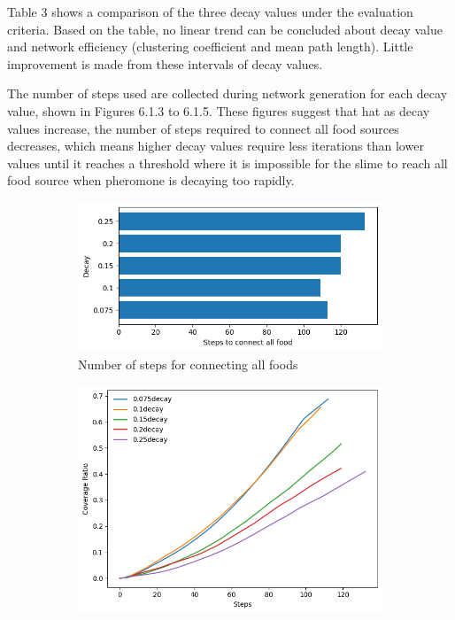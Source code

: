 \documentclass[11pt]{article}
\begin{document}
\newpage
Table 3 shows a comparison of the three decay values under the evaluation criteria. Based on the table, no linear trend can be concluded about decay value and network efficiency (clustering coefficient and mean path length). Little improvement is made from these intervals of decay values. \par
	The number of steps used are collected during network generation for each decay value, shown in Figures 6.1.3 to 6.1.5. These figures suggest that hat as decay values increase, the number of steps required to connect all food sources decreases, which means higher decay values require less iterations than lower values until it reaches a threshold where it is impossible for the slime to reach all food source when pheromone is decaying too rapidly. 
\begin{figure}[H]
    \centering
    \begin{subfigure}{0.32\textwidth}
        \centering
        \includegraphics[width=\linewidth]{nostep.png}
        \caption{Number of steps for connecting all foods}
    \end{subfigure}\hfill
    \begin{subfigure}{0.32\textwidth}
        \centering
        \includegraphics[width=\linewidth]{coverage.png}

\end{subfigure}
\end{figure}
\end{document}
